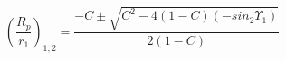 \begin{equation*}
\left(\frac{R_{p}}{r_{1}}\right)_{1,2} = \frac{-C \pm \sqrt{C^{2} - 4 (1 - C)(-sin_{2}\Upsilon_{1})}}{2(1 - C)} \tag{4.26}
\end{equation*}

